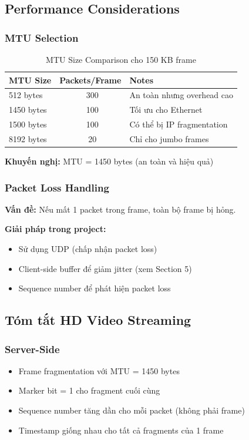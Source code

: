 \documentclass[a4paper,12pt]{article}
\begin{document}
\subsection{Performance Considerations}

\subsubsection{MTU Selection}

\begin{table}[H]
\centering
\begin{tabular}{|l|c|l|}
\hline
\textbf{MTU Size} & \textbf{Packets/Frame} & \textbf{Notes} \\
\hline
512 bytes & ~300 & An toàn nhưng overhead cao \\
1450 bytes & ~100 & Tối ưu cho Ethernet \\
1500 bytes & ~100 & Có thể bị IP fragmentation \\
8192 bytes & ~20 & Chỉ cho jumbo frames \\
\hline
\end{tabular}
\caption{MTU Size Comparison cho 150 KB frame}
\end{table}

\textbf{Khuyến nghị:} MTU = 1450 bytes (an toàn và hiệu quả)

\subsubsection{Packet Loss Handling}

\textbf{Vấn đề:} Nếu mất 1 packet trong frame, toàn bộ frame bị hỏng.

\textbf{Giải pháp trong project:}
\begin{itemize}
    \item Sử dụng UDP (chấp nhận packet loss)
    \item Client-side buffer để giảm jitter (xem Section 5)
    \item Sequence number để phát hiện packet loss
\end{itemize}

\subsection{Tóm tắt HD Video Streaming}

\subsubsection{Server-Side}
\begin{itemize}
    \item Frame fragmentation với MTU = 1450 bytes
    \item Marker bit = 1 cho fragment cuối cùng
    \item Sequence number tăng dần cho mỗi packet (không phải frame)
    \item Timestamp giống nhau cho tất cả fragments của 1 frame
\end{itemize}
\end{document}
